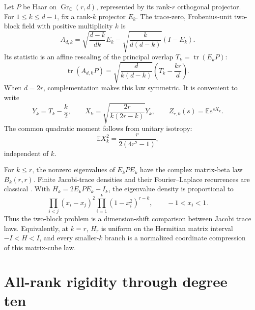 \documentclass[11pt]{article}
\newcommand{\E}{\mathbb E}
\newcommand{\C}{\mathbb C}
\newcommand{\tr}{\operatorname{tr}}
\newcommand{\Gr}{\operatorname{Gr}}
\begin{document}
Let $P$ be Haar on $\Gr_{\C}(r,d)$, represented by its rank-$r$ orthogonal
projector.  For $1\le k\le d-1$, fix a rank-$k$ projector $E_k$.  The
trace-zero, Frobenius-unit two-block field with positive multiplicity $k$ is
\begin{equation}
 A_{d,k}=\sqrt{\frac{d-k}{dk}}E_k
       -\sqrt{\frac{k}{d(d-k)}}(I-E_k).                     \tag{2.1}
\end{equation}
Its statistic is an affine rescaling of the principal overlap
$T_k=\tr(E_kP)$:
\begin{equation}
 \tr(A_{d,k}P)
 =\sqrt{\frac{d}{k(d-k)}}\left(T_k-\frac{kr}{d}\right).    \tag{2.2}
\end{equation}
When $d=2r$, complementation makes this law symmetric.  It is convenient to
write
\begin{equation}
 Y_k=T_k-\frac{k}{2},\qquad
 X_k=\sqrt{\frac{2r}{k(2r-k)}}Y_k,\qquad
 Z_{r,k}(s)=\E e^{sX_k}.                                    \tag{2.3}
\end{equation}
The common quadratic moment follows from unitary isotropy:
\begin{equation}
 \E X_k^2=\frac{r}{2(4r^2-1)},                              \tag{2.4}
\end{equation}
independent of $k$.

For $k\le r$, the nonzero eigenvalues of $E_kPE_k$ have the complex
matrix-beta law $B_k(r,r)$.  Finite Jacobi-trace densities and their
Fourier--Laplace recurrences are classical \cite{ForresterKumar2022}.  With
$H_k=2E_kPE_k-I_k$, the eigenvalue density is
proportional to
\begin{equation}
 \prod_{i<j}(x_i-x_j)^2\prod_{i=1}^k(1-x_i^2)^{r-k},
 \qquad -1<x_i<1.                                         \tag{2.5}
\end{equation}
Thus the two-block problem is a dimension-shift comparison between Jacobi
trace laws.  Equivalently, at $k=r$, $H_r$ is uniform on the Hermitian matrix
interval $-I<H<I$, and every smaller-$k$ branch is a normalized coordinate
compression of this matrix-cube law.

\section{All-rank rigidity through degree ten}
\end{document}
